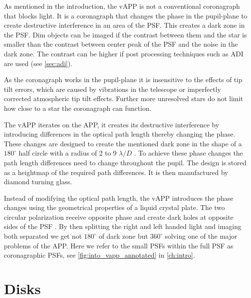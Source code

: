 As mentioned in the introduction, the \ac{vAPP} is not a conventional coronagraph that blocks light. It is a coronagraph that changes the phase in the pupil-plane to create destructive interference in an area of the \ac{PSF}. This creates a dark zone in the \ac{PSF}. Dim objects can be imaged if the contrast between them and the star is smaller than the contrast between center peak of the \ac{PSF} and the noise in the dark zone. The contrast can be higher if post processing techniques such as \ac*{ADI} are used (see \autoref{sec:adi}).

As the coronagraph works in the pupil-plane it is insensitive to the effects of tip tilt errors, which are caused by vibrations in the telescope or imperfectly corrected atmospheric tip tilt effects. Further more unresolved stars do not limit how close to a star the coronagraph can function.

The \ac{vAPP} iterates on the \ac{APP}, it creates its destructive interference by introducing differences in the optical path length thereby changing the phase. These changes are designed to create the mentioned dark zone in the shape of a $180^\circ$ half circle with a radius of 2 to 9 $\lambda/D$ \cite{vapp_doelman}. To achieve these phase changes the path length differences need to change throughout the pupil. The design is stored as a heightmap of the required path differences. It is then manufactured by diamond turning glass. 

Instead of modifying the optical path length, the \ac{vAPP} introduces the phase changes using the geometrical properties of a liquid crystal plate. The two circular polarization receive opposite phase and create dark holes at opposite sides of the \ac{PSF} \cite{vapp_snik} \cite{vapp_otten} \cite{vapp_doelman}. By then splitting the right and left handed light and imaging both separated we get not $180^\circ$ of dark zone but $360^\circ$ solving one of the major problems of the \ac{APP}. Here we refer to the small \acp{PSF} within the full \ac{PSF} as coronagraphic \acp{PSF}, see \autoref{fig:into_vapp_annotated} in \autoref{ch:intro}.






\section{Disks} %
\label{sec:disks} %


